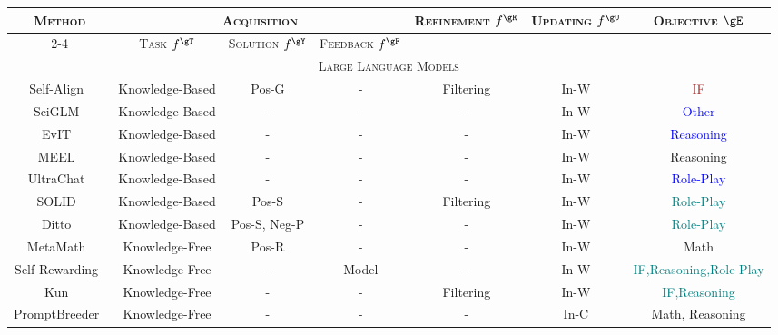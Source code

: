 \documentclass[sn-basic, Numbered]{sn-jnl}%
\theoremstyle{thmstyleone}%
\theoremstyle{thmstyletwo}%
\theoremstyle{thmstylethree}%
\begin{document}
\begin{table}
\centering 
\setlength{\tabcolsep}{1mm}
\scriptsize
\begin{tabular}{ccccccc}
\toprule 
    \multirow{2}{*}{\textsc{Method}} & \multicolumn{3}{c}{\textsc{Acquisition}} & \multirow{2}{*}{\textsc{Refinement} $f^{\gR}$} & \multirow{2}{*}{\textsc{Updating} $f^{\gU}$} & \multirow{2}{*}{\textsc{Objective} $\gE$} \\
\cmidrule{2-4}
 & \textsc{Task} $f^{\gT}$ & \textsc{Solution} $f^{\gY}$ & \textsc{Feedback} $f^{\gF}$ & & & \\
\midrule 
\multicolumn{7}{c}{\textsc{Large Language Models}}\\
\midrule
    Self-Align~\cite{sun2024principle}    & Knowledge-Based  & Pos-G    & -          & Filtering   & In-W       & \textcolor{brown}{IF}       \\
SciGLM~\cite{zhang2024sciglm}         & Knowledge-Based  & -        & -          & -           & In-W       & \textcolor{blue}{Other}             \\
EvIT~\cite{tao2024evit}               & Knowledge-Based  & -        & -          & -           & In-W       & \textcolor{blue}{Reasoning}        \\
MEEL~\cite{tao2024meel}               & Knowledge-Based  & -        & -          & -           & In-W       & Reasoning         \\
UltraChat~\cite{ding2023enhancing}& Knowledge-Based & -    & -          & -           & In-W       & \textcolor{blue}{Role-Play}   \\
SOLID~\cite{askari2024self}           & Knowledge-Based  & Pos-S    & -          & Filtering   & In-W       & \textcolor{teal}{Role-Play}         \\
Ditto~\cite{lu2024large}              & Knowledge-Based  & Pos-S, Neg-P & -    & -           & In-W       & \textcolor{teal}{Role-Play}         \\
MetaMath~\cite{yu2023metamath}        & Knowledge-Free   & Pos-R    & -          & -           & In-W       & Math              \\
Self-Rewarding~\cite{yuan2024self}    & Knowledge-Free   & -        & Model      & -           & In-W       & \textcolor{teal}{IF,Reasoning,Role-Play}                \\
Kun~\cite{zheng2024kun}               & Knowledge-Free   & -        & -          & Filtering   & In-W       & \textcolor{teal}{IF,Reasoning}                \\
PromptBreeder~\cite{fernando2023promptbreeder} & Knowledge-Free & -    & -          & -           & In-C       & Math, Reasoning   \\

\end{tabular}
\end{table}
\end{document}
